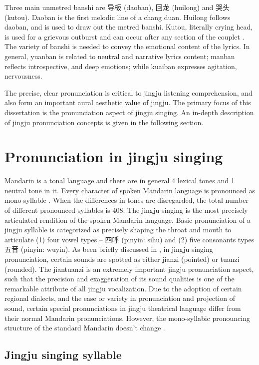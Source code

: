 Three main unmetred banshi are 导板 (daoban), 回龙 (huilong) and 哭头 (kutou). Daoban is the first melodic line of a chang duan. Huilong follows daoban, and is used to draw out the metred banshi. Kutou, literally crying head, is used for a grievous outburst and can occur after any section of the couplet \cite{Repetto2018}. The variety of banshi is needed to convey the emotional content of the lyrics. In general, yuanban is related to neutral and narrative lyrics content; manban reflects introspective, and deep emotions; while kuaiban expresses agitation, nervousness.

The precise, clear pronunciation is critical to jingju listening comprehension, and also form an important aural aesthetic value of jingju. The primary focus of this dissertation is the pronunciation aspect of jingju singing. An in-depth description of jingju pronunciation concepts is given in the following section.

\section{Pronunciation in jingju singing}

Mandarin is a tonal language and there are in general 4 lexical tones and 1 neutral tone in it. Every character of spoken Mandarin language is pronounced as mono-syllable \cite{lin_new_1993}. When the differences in tones are disregarded, the total number of different pronounced syllables is 408. The jingju singing is the most precisely articulated rendition of the spoken Mandarin language. Basic pronunciation of a jingju syllable is categorized as precisely shaping the throat and mouth to articulate (1) four vowel types -- 四呼 (pinyin: sihu) and (2) five consonants types 五音 (pinyin: wuyin). As been briefly discussed in , in jingju singing pronunciation, certain sounds are spotted as either jianzi (pointed) or tuanzi (rounded). The jiantuanzi is an extremely important jingju pronunciation aspect, such that the precision and exaggeration of its sound qualities is one of the remarkable attribute of all jingju vocalization. Due to the adoption of certain regional dialects, and the ease or variety in pronunciation and projection of sound, certain special pronunciations in jingju theatrical language differ from their normal Mandarin pronunciations. However, the mono-syllabic pronouncing structure of the standard Mandarin doesn't change \cite{Wichmann1991a}. 

\subsection{Jingju singing syllable}\label{sec:ch2:jingju_syllable}

